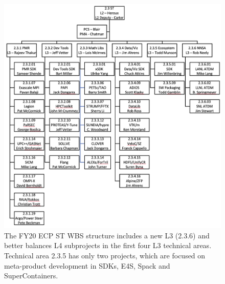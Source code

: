 \begin{figure}
	\centering
	\includegraphics[width=0.9\linewidth]{STFY20WBS}
	\caption{\label{fig:wbs-FY20} The FY20 ECP ST WBS structure includes a new L3 (2.3.6) and better balances L4 subprojects in the first four L3 technical areas.  Technical area 2.3.5 has only two projects, which are focused on meta-product development in SDKs, E4S, Spack and SuperContainers.}
\end{figure}


